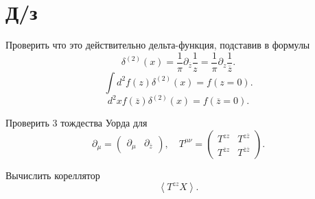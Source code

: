 \documentclass[a4paper]{article}
\begin{document}
\section*{Д/з}
\begin{hiProb}[Задача 1]
Проверить что это действительно дельта-функция, подставив
в формулы
\[
	\delta ^{(2)} (x)= \frac{1}{\pi} \partial_{\overline{z}}
	\frac{1}{z}= \frac{1}{\pi} \partial_z \frac{1}{\overline{z}}
.\] 
\[
	\int d^2 f(z) \delta ^{(2)}\left( x \right) =f(z=0)
.\] 
\[
	d^2 x f\left( \overline{z} \right) \delta ^{(2)}(x)
	=f(\overline{z}=0)
.\] 

\end{hiProb}
\begin{hiProb}[Задача 2 ]
Проверить 3 тождества Уорда для
\[
	\partial_\mu = \begin{pmatrix} \partial_\mu &
	\partial_{\overline{z}}\end{pmatrix},\quad
	T^{\mu\nu}=
		\begin{pmatrix} T^{zz} & T^{z \overline{z}}\\
		T^{\overline{z} z}& T^{\overline{z} \overline{z}}\end{pmatrix} 
.\] 
\end{hiProb}
\begin{hiProb}[Задача 3]
Вычислить кореллятор
\[
\left<T^{zz} X \right>
.\] 
\end{hiProb}
\end{document}
